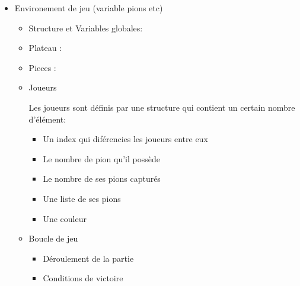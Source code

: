\documentclass[10pt,a4paper,oneside]{report}
\begin{document}
\begin{itemize}
    \item Environement de jeu (variable pions etc)
    \begin{itemize}
        \item Structure et Variables globales:
        
        \item Plateau :



        \item Pieces :
        \\
               
        \item Joueurs

        Les joueurs sont définis par une structure qui contient un certain nombre d'élément:
        \begin{itemize}
            \item Un index qui diférencies les joueurs entre eux
            \item Le nombre de pion qu'il possède
            \item Le nombre de ses pions capturés
            \item Une liste de ses pions
            \item Une couleur
        \end{itemize}
        \item Boucle de jeu
        \begin{itemize}
            \item Déroulement de la partie 
            \item Conditions de victoire
        \end{itemize}
    \end{itemize}


\end{itemize}
\end{document}

